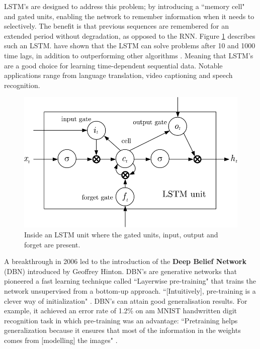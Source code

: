 \documentclass[report, 11pt, oneside]{dissertation}
\begin{document}
 
 LSTM's are designed to address this problem; by introducing a ``memory cell" and gated units, enabling the network to remember information when it needs to selectively. The benefit is that previous sequences are remembered for an extended period without degradation, as opposed to the RNN. Figure \ref{fig:lstm} describes such an LSTM. \citeauthor{Hochreiter:1997:LSM:1246443.1246450} have shown that the LSTM can solve problems after 10 and 1000 time lags, in addition to outperforming other algorithms \citeyearpar[10-11]{Hochreiter:1997:LSM:1246443.1246450}. Meaning that LSTM’s are a good choice for learning time-dependent sequential data. Notable applications range from language translation, video captioning and speech recognition.
 
  \begin{figure}[!htb]
	\centering
	\includegraphics[scale=0.65]{figure_7}
	\caption[LSTM unit.]{Inside an LSTM unit where the gated units, input, output and forget are present.}
	\label{fig:lstm}
\end{figure}

A breakthrough in 2006 led to the introduction of the \textbf{Deep Belief Network} (DBN) introduced by Geoffrey Hinton. DBN's are generative networks that pioneered a fast learning technique called ``Layerwise pre-training" that trains the network unsupervised from a bottom-up approach. ``[Intuitively], pre-training is a clever way of initialization" \citep[30]{wang:2017}. DBN's can attain good generalisation results. For example, it achieved an error rate of 1.2\% on am MNIST handwritten digit recognition task \citep{HinSal06} in which pre-training was an advantage: ``Pretraining helps generalization because it ensures that most of the information in the weights comes from [modelling] the images" \citep[507]{HinSal06}.  
\end{document}
